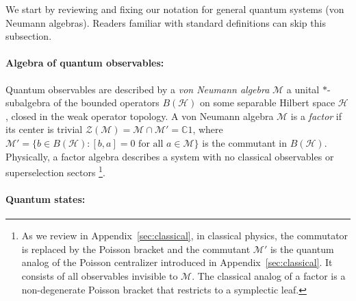 \documentclass[a4paper,11pt]{article}
\theoremstyle{definition}
\newcommand{\mH}{\mathcal{H}}
\newcommand{\mM}{\mathcal{M}}
\begin{document}
We start by reviewing and fixing our notation for general quantum systems (von Neumann algebras). Readers familiar with standard definitions can skip this subsection.

\paragraph{Algebra of quantum observables:}
Quantum observables are described by a
\emph{von Neumann algebra} $\mM$ a unital $*$-subalgebra of the bounded operators
$B(\mathcal{H})$ on some separable Hilbert space $\mathcal{H}$, closed in the
weak operator topology.
A von Neumann algebra $\mM$ is a \emph{factor} if its center is trivial
$\mathcal{Z}(\mM) = \mM\cap\mM'=\mathbb{C} 1$, where $\mM' = \{b\in B(\mathcal{H}) : [b,a]=0\text{ for all }a\in\mM\}$
is the commutant in $B(\mH)$.  Physically, a factor algebra describes a system with no classical observables
 or superselection sectors \footnote{As we review in Appendix~\ref{sec:classical}, in classical physics, the commutator is replaced by the Poisson bracket and the commutant $\mM'$ is the quantum analog of the Poisson
centralizer introduced in Appendix~\ref{sec:classical}. It consists of all observables invisible to $\mM$. The classical analog of a factor is a non-degenerate Poisson bracket that restricts to a symplectic leaf.}.

\paragraph{Quantum states:}
\end{document}
